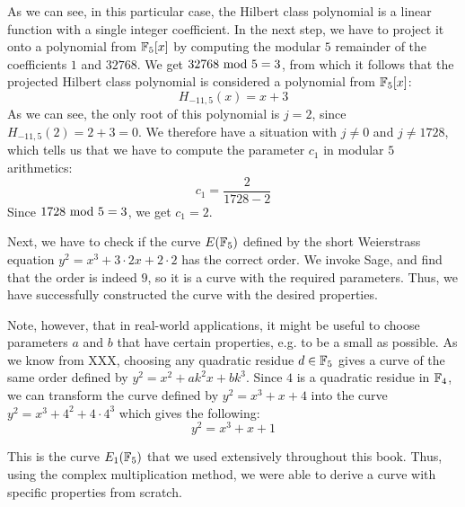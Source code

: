 \begin{example}
As we can see, in this particular case, the Hilbert class polynomial is a linear function with a single integer coefficient. In the next step, we have to project it onto a polynomial from $\mathbb{F}_5[x]$ by computing the modular $5$ remainder of the coefficients $1$ and $32768$. We get $32768 \text{ mod } 5=3$, from which it follows that the projected Hilbert class polynomial is considered a polynomial from $\mathbb{F}_5[x]$:
$$
H_{-11,5}(x)=x+3
$$ 
 As we can see, the only root of this polynomial is $j=2$, since $H_{-11,5}(2)=2+3=0$. We therefore have a situation with $j\neq 0$ and $j\neq 1728$, which tells us that we have to compute the parameter $c_1$ in modular $5$ arithmetics:
$$
c_1=\frac{2}{1728-2}
$$
 Since $1728 \text{ mod } 5=3$, we get $c_1=2$. 
 
 Next, we have to check if the curve $E(\mathbb{F}_5)$ defined by the short Weierstrass equation  $y^2 = x^3 + 3\cdot 2 x + 2\cdot 2$ has the correct order. We invoke Sage, and find that the order is indeed $9$, so it is a curve with the required parameters. Thus, we have successfully constructed the curve with the desired properties.

Note, however, that in real-world applications, it might be useful to choose parameters $a$ and $b$ that have certain properties, e.g. to be a small as possible. As we know from XXX, choosing any quadratic residue $d\in \mathbb{F}_5$ gives a curve of the same order defined by $y^2 = x^2 + a k^2 x + bk^3$. Since $4$ is a quadratic residue in $\mathbb{F}_4$, we can transform the curve defined by 
$y^2 = x^3 +x+4$ into the curve $y^2 = x^3 + 4^2 + 4\cdot 4^3$ which gives the following:
$$
y^2 = x^3 + x +1
$$

This is the curve $E_1(\mathbb{F}_5)$ that we used extensively throughout this book. Thus, using the complex multiplication method, we were able to derive a curve with specific properties from scratch.
\end{example}

